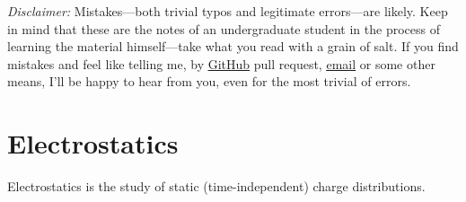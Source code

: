 \documentclass[11pt, a4paper]{article}
\begin{document}
\vspace{2mm}
\textit{Disclaimer:} Mistakes---both trivial typos and legitimate errors---are likely. Keep in mind that these are the notes of an undergraduate student in the process of learning the material himself---take what you read with a grain of salt. If you find mistakes and feel like telling me, by \href{https://github.com/ejmastnak/fmf}{\underline{GitHub}} pull request, \href{mailto:ejmastnak@gmail.com}{\underline{email}} or some other means, I'll be happy to hear from you, even for the most trivial of errors.

\newpage

\pagestyle{empty}  %

\tableofcontents

\newpage

\pagestyle{fancy}  %

\section{Electrostatics}
Electrostatics is the study of static (time-independent) charge distributions.
\end{document}
